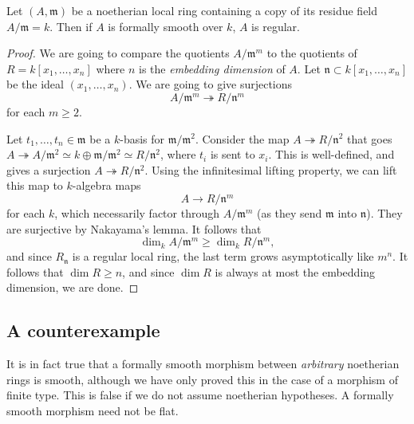 \begin{theorem} 
Let $(A, \mathfrak{m})$ be a noetherian local ring containing a copy of its
residue field $A/\mathfrak{m}= k$. Then if $A$ is formally smooth over $k$, $A$
is regular.
\end{theorem} 
\begin{proof} 
We are going to compare the quotients $A/\mathfrak{m}^m$ to the quotients of
$R= k[x_1, \dots, x_n]$ where  $n$ is the \emph{embedding dimension} of
$A$.
Let $\mathfrak{n} \subset k[x_1, \dots, x_n]$ be the ideal $(x_1, \dots, x_n)$. 
We are going to give surjections
\[ A/\mathfrak{m}^m \twoheadrightarrow R/\mathfrak{n}^m  \]
for each $m \geq 2$.

Let $t_1, \dots, t_n \in \mathfrak{m}$ be a $k$-basis for
$\mathfrak{m}/\mathfrak{m}^2$.
Consider the map $A \twoheadrightarrow R/\mathfrak{n}^2 $ that goes
$A  \twoheadrightarrow A/\mathfrak{m}^2 \simeq  k \oplus
\mathfrak{m}/\mathfrak{m}^2 \simeq R/\mathfrak{n}^2$, where $t_i$ is sent to
$x_i$. This is well-defined, and gives a surjection $A \twoheadrightarrow
R/\mathfrak{n}^2$.
Using the infinitesimal lifting property, we can lift this map to
$k$-algebra maps
\[ A \to R/\mathfrak{n}^m  \]
for each $k$, which necessarily factor through $A/\mathfrak{m}^m$ (as they send
$\mathfrak{m}$ into $\mathfrak{n}$). They are surjective by Nakayama's lemma.
It follows that
\[ \dim_k A/\mathfrak{m}^m \geq \dim_k R/\mathfrak{n}^m,  \]
and since $R_{\mathfrak{n}}$ is a regular local ring, the last term grows
asymptotically like $m^n$. It follows that $\dim R \geq n$, and since $\dim R$
is always at most the embedding dimension, we are done.
\end{proof} 


\subsection{A counterexample}

It is in fact true that a formally smooth morphism between \emph{arbitrary} noetherian rings is
smooth, although we have only proved this in the case of a morphism of finite
type.
This is false if we do not assume noetherian hypotheses.
A formally smooth morphism need not be flat.

